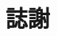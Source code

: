 \documentclass[class=NCU_thesis, crop=false]{standalone}
\begin{document}
\chapter{誌謝}




\end{document}
